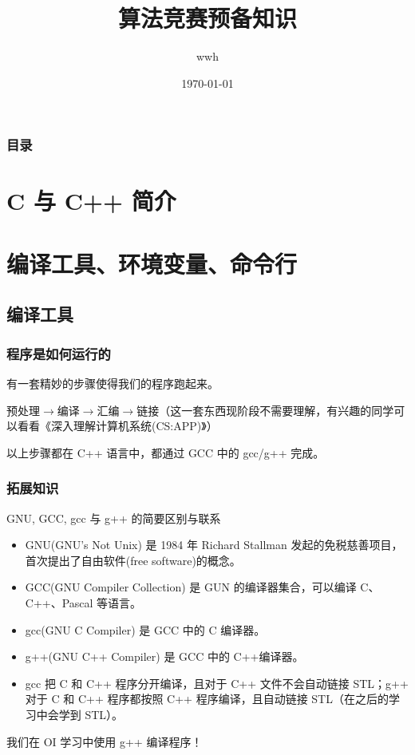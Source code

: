 \documentclass[10pt]{beamer}
\title{算法竞赛预备知识}
\author{wwh}
\institute{合肥一六八中学}
\date{\today}
\begin{document}
	\frame{\titlepage}%
	
	\begin{frame}
		\frametitle{目录}
		\tableofcontents %
	\end{frame}

	\section{C 与 C++ 简介}

	\section{编译工具、环境变量、命令行}	
	
	\subsection{编译工具}
	\begin{frame}
		\frametitle{程序是如何运行的}
		有一套精妙的步骤使得我们的程序跑起来。
		
		预处理$\to$编译$\to$汇编$\to$链接（这一套东西现阶段不需要理解，有兴趣的同学可以看看《深入理解计算机系统(CS:APP)》）
		
		\pause
		
		以上步骤都在 C++ 语言中，都通过 GCC 中的 gcc/g++ 完成。
	\end{frame}
	\begin{frame}
		\frametitle{拓展知识}
		\begin{block}{GNU, GCC, gcc 与 g++ 的简要区别与联系}
			\begin{itemize}
				\item<1-> GNU(GNU's Not Unix) 是 1984 年 Richard Stallman 发起的免税慈善项目，首次提出了自由软件(free software)的概念。
				\item<2-> GCC(GNU Compiler Collection) 是 GUN 的编译器集合，可以编译 C、C++、Pascal 等语言。
				\item<3-> gcc(GNU C Compiler) 是 GCC 中的 C 编译器。
				\item<3-> g++(GNU C++ Compiler) 是 GCC 中的 C++编译器。
				\item<4-> gcc 把 C 和 C++ 程序分开编译，且对于 C++ 文件不会自动链接 STL；g++ 对于 C 和 C++ 程序都按照 C++ 程序编译，且自动链接 STL（在之后的学习中会学到 STL）。
			\end{itemize}
		\end{block}
		
		\pause
		\pause
		\pause
		
		
		我们在 OI 学习中使用 g++ 编译程序！
	\end{frame}
	
\end{document}
